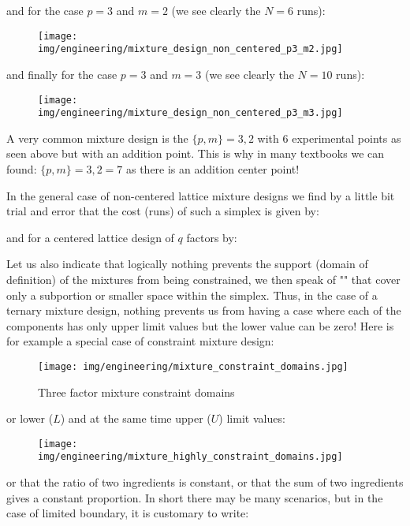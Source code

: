 	and for the case $p=3$ and $m=2$ (we see clearly the $N=6$ runs):
	\begin{figure}[H]
		\centering
		\texttt{[image: img/engineering/mixture\_design\_non\_centered\_p3\_m2.jpg]}
	\end{figure}
	and finally for the case $p=3$ and $m=3$ (we see clearly the $N=10$ runs):
	\begin{figure}[H]
		\centering
		\texttt{[image: img/engineering/mixture\_design\_non\_centered\_p3\_m3.jpg]}
	\end{figure}
	A very common mixture design is the $\{p,m\}={3,2}$ with $6$ experimental points as seen above but with an addition point. This is why in many textbooks we can found: $\{p,m\}={3,2}=7$ as there is an addition center point!
	
	In the general case of non-centered lattice mixture designs we find by a little bit trial and error that the cost (runs) of such a simplex is given by:
	
	and for a centered lattice design of $q$ factors by:
	
	Let us also indicate that logically nothing prevents the support (domain of definition) of the mixtures from being constrained, we then speak of "" that cover only a subportion or smaller space within the simplex. Thus, in the case of a ternary mixture design, nothing prevents us from having a case where each of the components has only upper limit values but the lower value can be zero! Here is for example a special case of constraint mixture design:
	\begin{figure}[H]
		\centering
		\texttt{[image: img/engineering/mixture\_constraint\_domains.jpg]}
		\caption{Three factor mixture constraint domains}
	\end{figure}
	or lower ($L$) and at the same time upper ($U$) limit values:	
	\begin{figure}[H]
		\centering
		\texttt{[image: img/engineering/mixture\_highly\_constraint\_domains.jpg]}
	\end{figure}
	or that the ratio of two ingredients is constant, or that the sum of two ingredients gives a constant proportion. In short there may be many scenarios, but in the case of limited boundary, it is customary to write:
	
